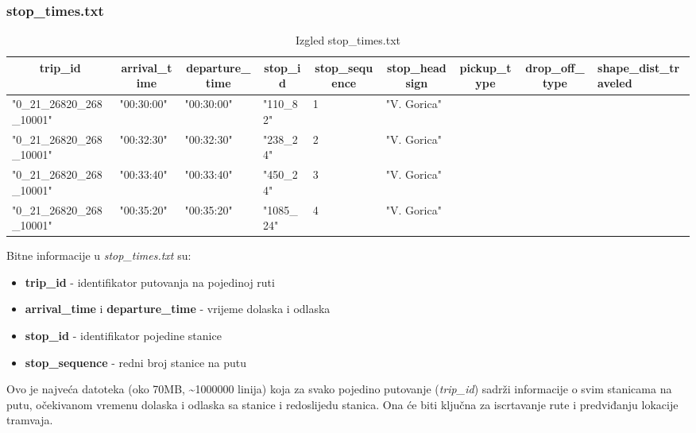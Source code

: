 \documentclass[zavrsnirad]{fer}
\begin{document}
\subsubsection{stop\_times.txt}

\begin{table}[htb]
	\begin{adjustbox}{width=\columnwidth,center}
		\begin{tabular}{l|l|l|l|l|l|l|l|l}
			\hline
			\multicolumn{1}{c|}{\textbf{trip\_id}} & \multicolumn{1}{c|}{\textbf{arrival\_time}} & \multicolumn{1}{c|}{\textbf{departure\_time}} & \multicolumn{1}{c|}{\textbf{stop\_id}} & \multicolumn{1}{c|}{\textbf{stop\_sequence}} & \multicolumn{1}{c|}{\textbf{stop\_headsign}} & \multicolumn{1}{c|}{\textbf{pickup\_type}} & \multicolumn{1}{c|}{\textbf{drop\_off\_type}} & \textbf{shape\_dist\_traveled} \\ \hline
			"0\_21\_26820\_268\_10001" & "00:30:00" & "00:30:00" & "110\_82" & 1 & "V. Gorica" &  &  &  \\ \hline
			"0\_21\_26820\_268\_10001" & "00:32:30" & "00:32:30" & "238\_24" & 2 & "V. Gorica" &  &  &  \\ \hline
			"0\_21\_26820\_268\_10001" & "00:33:40" & "00:33:40" & "450\_24" & 3 & "V. Gorica" &  &  &  \\ \hline
			"0\_21\_26820\_268\_10001" & "00:35:20" & "00:35:20" & "1085\_24" & 4 & "V. Gorica" &  &  &  \\ \hline
		\end{tabular}
	\end{adjustbox}
	\caption{Izgled stop\_times.txt}
	\label{tbl:stop_times}
\end{table}

Bitne informacije u \textit{stop\_times.txt} su:
\begin{itemize}
	\item \textbf{trip\_id} - identifikator putovanja na pojedinoj ruti
	\item \textbf{arrival\_time} i \textbf{departure\_time} - vrijeme dolaska i odlaska
	\item \textbf{stop\_id} - identifikator pojedine stanice
	\item \textbf{stop\_sequence} - redni broj stanice na putu
\end{itemize}
Ovo je najveća datoteka (oko 70MB, \textasciitilde{}1000000 linija) koja za svako pojedino putovanje (\textit{trip\_id}) sadrži informacije o svim stanicama na putu, očekivanom vremenu dolaska i odlaska sa stanice i redoslijedu stanica. Ona će biti ključna za iscrtavanje rute i predviđanju lokacije tramvaja.
\end{document}
